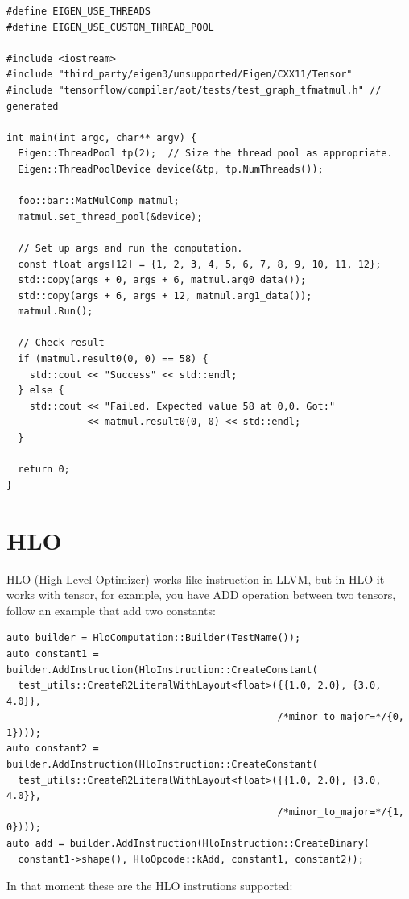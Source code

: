 \documentclass[11pt,openany]{book}
\begin{document}
\begin{verbatim}
#define EIGEN_USE_THREADS
#define EIGEN_USE_CUSTOM_THREAD_POOL

#include <iostream>
#include "third_party/eigen3/unsupported/Eigen/CXX11/Tensor"
#include "tensorflow/compiler/aot/tests/test_graph_tfmatmul.h" // generated

int main(int argc, char** argv) {
  Eigen::ThreadPool tp(2);  // Size the thread pool as appropriate.
  Eigen::ThreadPoolDevice device(&tp, tp.NumThreads());

  foo::bar::MatMulComp matmul;
  matmul.set_thread_pool(&device);

  // Set up args and run the computation.
  const float args[12] = {1, 2, 3, 4, 5, 6, 7, 8, 9, 10, 11, 12};
  std::copy(args + 0, args + 6, matmul.arg0_data());
  std::copy(args + 6, args + 12, matmul.arg1_data());
  matmul.Run();

  // Check result
  if (matmul.result0(0, 0) == 58) {
    std::cout << "Success" << std::endl;
  } else {
    std::cout << "Failed. Expected value 58 at 0,0. Got:"
              << matmul.result0(0, 0) << std::endl;
  }

  return 0;
}
\end{verbatim}

\section{HLO}
HLO (High Level Optimizer) works like instruction in LLVM, but in HLO it works with tensor, for example, you have ADD operation between two tensors, follow an example that add two constants:

\begin{verbatim}
auto builder = HloComputation::Builder(TestName());
auto constant1 = builder.AddInstruction(HloInstruction::CreateConstant(
  test_utils::CreateR2LiteralWithLayout<float>({{1.0, 2.0}, {3.0, 4.0}},
                                               /*minor_to_major=*/{0, 1})));
auto constant2 = builder.AddInstruction(HloInstruction::CreateConstant(
  test_utils::CreateR2LiteralWithLayout<float>({{1.0, 2.0}, {3.0, 4.0}},
                                               /*minor_to_major=*/{1, 0})));
auto add = builder.AddInstruction(HloInstruction::CreateBinary(
  constant1->shape(), HloOpcode::kAdd, constant1, constant2));
\end{verbatim}

In that moment these are the HLO instrutions supported:
\end{document}
